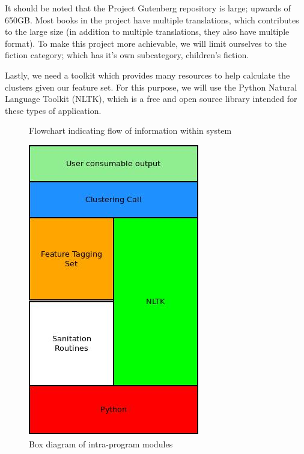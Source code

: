 \documentclass[]{article}
\begin{document}
It should be noted that the Project Gutenberg repository is large; upwards of 650GB.
Most books in the project have multiple translations, which contributes to the large size (in addition to multiple translations, they also have multiple format).
To make this project more achievable, we will limit ourselves to the fiction category; which has it's own subcategory, children's fiction.

Lastly, we need a toolkit which provides many resources to help calculate the clusters given our feature set.
For this purpose, we will use the Python Natural Language Toolkit (NLTK), which is a free and open source library intended for these types of application.


\printbibliography



\begin{figure}
	\label{flowchart}
	\caption{Flowchart indicating flow of information within system}
	\centering
\end{figure}

\begin{figure}
	\label{boxchart}
	\caption{Box diagram of intra-program modules}
	\centering
	\includegraphics{../StackDiagram.jpg}
\end{figure}
\end{document}
